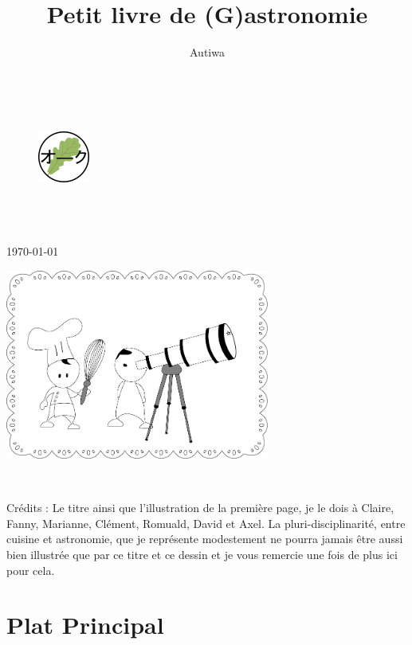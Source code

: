 \documentclass[a4paper,twoside,openright]{report}
\title{Petit livre de (G)astronomie}
\author{Autiwa}
\makeatletter
\def\cleardoublepage{\clearpage\if@twoside \ifodd\c@page\else
\hbox{} 
\thispagestyle{empty}
\newpage
\if@twocolumn\hbox{}\newpage\fi\fi\fi}
\makeatother
\begin{document}
\begin{titlepage}
\begin{center}
~
\vfill
\begin{figure}[t]
\centering
\includegraphics[width=0.15\textwidth]{figures/logo-autiwa.pdf}
\end{figure}

\HRule \\[0.4cm]
{ \huge \bfseries \makeatletter\@title\makeatother}\\[0.4cm]

\HRule \\[0.75cm]
{\large \today}\\[0.75cm]
\makeatletter
\@author
\makeatother
\vfill
\begin{center}
\includegraphics[width=0.65\textwidth]{figures/couverture.pdf}
\end{center}
\vfill
~


\end{center}
\end{titlepage}

\cleardoublepage
\null
\vfill
\noindent
Crédits : Le titre ainsi que l'illustration de la première page, je le dois à Claire, Fanny, Marianne, Clément, Romuald, David 
et Axel. La pluri-disciplinarité, entre cuisine et astronomie, que je représente modestement ne pourra jamais être aussi bien 
illustrée que par ce titre et ce dessin et je vous remercie une fois de plus ici pour cela.
\hfill
\cleardoublepage

\dominitoc
\tableofcontents
\cleardoublepage
\chapter{Plat Principal}
\minitoc
\end{document}

